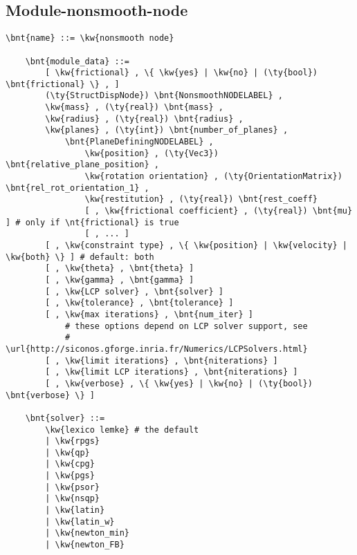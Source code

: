 \subsection{Module-nonsmooth-node}
\begin{Verbatim}[commandchars=\\\{\}]
    \bnt{name} ::= \kw{nonsmooth node}

    \bnt{module_data} ::=
        [ \kw{frictional} , \{ \kw{yes} | \kw{no} | (\ty{bool}) \bnt{frictional} \} , ]
        (\ty{StructDispNode}) \bnt{NonsmoothNODELABEL} ,
        \kw{mass} , (\ty{real}) \bnt{mass} ,
        \kw{radius} , (\ty{real}) \bnt{radius} ,
        \kw{planes} , (\ty{int}) \bnt{number_of_planes} ,
            \bnt{PlaneDefiningNODELABEL} ,
                \kw{position} , (\ty{Vec3}) \bnt{relative_plane_position} ,
                \kw{rotation orientation} , (\ty{OrientationMatrix}) \bnt{rel_rot_orientation_1} ,
                \kw{restitution} , (\ty{real}) \bnt{rest_coeff}
                [ , \kw{frictional coefficient} , (\ty{real}) \bnt{mu} ] # only if \nt{frictional} is true
                [ , ... ]
        [ , \kw{constraint type} , \{ \kw{position} | \kw{velocity} | \kw{both} \} ] # default: both
        [ , \kw{theta} , \bnt{theta} ]
        [ , \kw{gamma} , \bnt{gamma} ]
        [ , \kw{LCP solver} , \bnt{solver} ]
        [ , \kw{tolerance} , \bnt{tolerance} ]
        [ , \kw{max iterations} , \bnt{num_iter} ]
            # these options depend on LCP solver support, see
            # \url{http://siconos.gforge.inria.fr/Numerics/LCPSolvers.html}
        [ , \kw{limit iterations} , \bnt{niterations} ]
        [ , \kw{limit LCP iterations} , \bnt{niterations} ]
        [ , \kw{verbose} , \{ \kw{yes} | \kw{no} | (\ty{bool}) \bnt{verbose} \} ]

    \bnt{solver} ::=
        \kw{lexico lemke} # the default
        | \kw{rpgs}
        | \kw{qp}
        | \kw{cpg}
        | \kw{pgs}
        | \kw{psor}
        | \kw{nsqp}
        | \kw{latin}
        | \kw{latin_w}
        | \kw{newton_min}
        | \kw{newton_FB}
\end{Verbatim}

